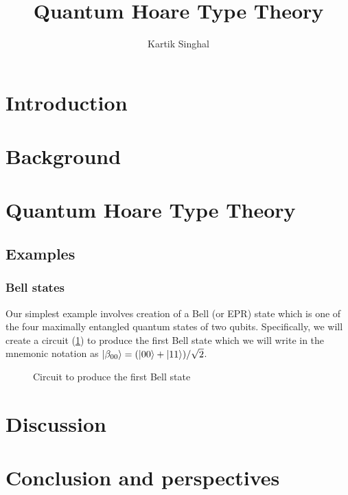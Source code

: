 \documentclass[adraft,creativecommons]{eptcs}
\title{Quantum Hoare Type Theory}
\author{
Kartik Singhal
\institute{University of Chicago}
\email{\mailtodomain{ks@cs.uchicago.edu}}
}
\begin{document}
\maketitle

\section{Introduction}

\section{Background}

\section{Quantum Hoare Type Theory}

\subsection{Examples}

\subsubsection{Bell states}

Our simplest example involves creation of a Bell (or EPR) state which is one of the four maximally entangled quantum states of two qubits. Specifically, we will create a circuit (\cref{fig:bell00}) to produce the first Bell state which we will write in the mnemonic notation as $\ket{\beta_{00}} = (\ket{00}+\ket{11})/\sqrt{2}$.

\begin{figure}
    \centering
    \caption{Circuit to produce the first Bell state}
    \label{fig:bell00}
\end{figure}

\section{Discussion}

\section{Conclusion and perspectives}


\end{document}
